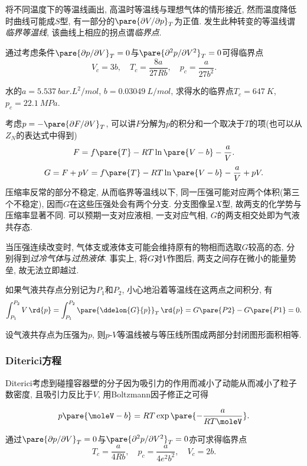 \documentclass[../Thermal.tex]{subfiles}
\begin{document}
将不同温度下的等温线画出, 高温时等温线与理想气体的情形接近, 然而温度降低时曲线可能成$S$型, 有一部分的$\pare{\partial V/\partial p}_T$为正值. 发生此种转变的等温线谓\emph{临界等温线}, 该曲线上相应的拐点谓\emph{临界点}.
\par
通过考虑条件$\pare{\partial p/\partial V}_T = 0$与$\pare{\partial^2 p/\partial V^2}_T = 0$可得临界点
\begin{equation}
\label{eq:vdwcritical}
V_c = 3b,\quad T_c = \frac{8a}{27Rb},\quad p_c = \frac{a}{27b^2}.
\end{equation}
\begin{ex}
水的$a=\SI{5.537}{bar.L^2/mol}$, $b=\SI{0.03049}{L/mol}$, 求得水的临界点$T_c=\SI{647}{K}$, $p_c=\SI{22.1}{MPa}$.
\end{ex}
考虑$p = -\pare{\partial F/\partial V}_T$, 可以讲$F$分解为$p$的积分和一个取决于$T$的项(也可以从$Z_N$的表达式中得到)
\[ F = f\pare{T} - RT\ln\pare{V-b} - \frac{a}{V}. \]
\[ G = F + pV = f\pare{T} - RT\ln\pare{V-b} - \frac{a}{V} + pV. \]
压缩率反常的部分不稳定, 从而临界等温线以下, 同一压强可能对应两个体积(第三个不稳定), 因而$G$在这些压强处会有两个分支. 分支图像呈$X$型, 故两支的化学势与压缩率显著不同. 可以预期一支对应液相, 一支对应气相, $G$的两支相交处即为气液共存态.
\par
当压强连续改变时, 气体支或液体支可能会维持原有的物相而选取$G$较高的态, 分别得到\emph{过冷气体}与\emph{过热液体}. 事实上, 将$G$对$V$作图后, 两支之间存在微小的能量势垒, 故无法立即越过.
\par
如果气液共存点分别记为$P_1$和$P_2$, 小心地沿着等温线在这两点之间积分, 有
\[ \int_{P_1}^{P_2}V\,\rd{p} = \int_{P_1}^{P_2} \pare{\ddelon{G}{p}}_T\,\rd{p} = G\pare{P2} - G\pare{P1} = 0. \]
\begin{finale}
\begin{corollary}[Maxwell面积法则]
设气液共存点为压强为$p$, 则$p$-$V$等温线被与等压线所围成两部分封闭图形面积相等.
\end{corollary}
\end{finale}
\subsubsection{Diterici方程}
Diterici考虑到碰撞容器壁的分子因为吸引力的作用而减小了动能从而减小了粒子数密度, 且吸引力反比于$V$, 用Boltzmann因子修正之可得
\begin{finale}
\begin{axiom}[Diterici方程]
\[ p\pare{\moleV - b} = RT \exp\pare{-\frac{a}{RT\moleV}}. \]
\end{axiom}
\end{finale}
通过$\pare{\partial p/\partial V}_T = 0$与$\pare{\partial^2 p/\partial V^2}_T = 0$亦可求得临界点
\[ T_c = \frac{a}{4Rb},\quad p_c = \frac{a}{4e^2b^2},\quad  V_c = 2b .\]
\end{document}
